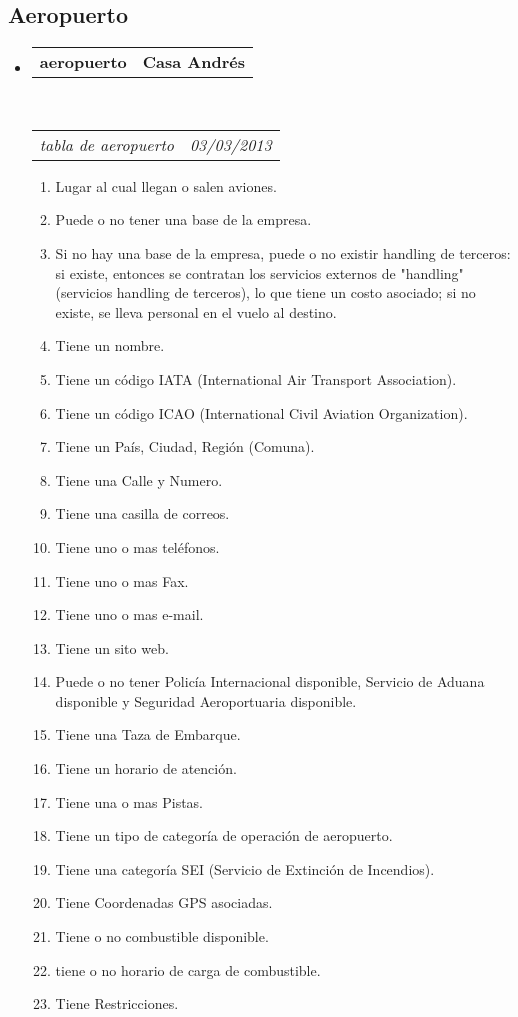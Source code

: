 \documentclass[10pt,letterpaper]{article}
\makeatletter
\newcommand{\headerrow}[2]
{\begin{tabular*}{\linewidth}{l@{\extracolsep{\fill}}r}
	#1 &
	#2 \\
\end{tabular*}}
\makeatother
\begin{document}
\subsection*{Aeropuerto}

\begin{itemize}
	\parskip=0.1em

	\item
	\headerrow
		{\textbf{aeropuerto}}
		{\textbf{Casa Andrés}}
	\\
	\headerrow
		{\emph{tabla de aeropuerto}}
		{\emph{03/03/2013}}
	\begin{enumerate}
		\item Lugar al cual llegan o salen aviones.
		\item Puede o no tener una base de la empresa.
		\item Si no hay una base de la empresa, puede o no existir handling de terceros: si existe, entonces se contratan los servicios externos de "handling" (servicios handling de terceros), lo que tiene un costo asociado; si no existe, se lleva personal en el vuelo al destino.
		\item Tiene un nombre.
		\item Tiene un código IATA (International Air Transport Association).
		\item Tiene un código ICAO (International Civil Aviation Organization).
		\item Tiene un País, Ciudad, Región (Comuna).
		\item Tiene una Calle y Numero.
		\item Tiene una casilla de correos.
		\item Tiene uno o mas teléfonos.
		\item Tiene uno o mas Fax.
		\item Tiene uno o mas e-mail.
		\item Tiene un sito web.
		\item Puede o no tener Policía Internacional disponible, Servicio de Aduana disponible y Seguridad Aeroportuaria disponible.
		\item Tiene una Taza de Embarque.
		\item Tiene un horario de atención.
		\item Tiene una o mas Pistas.
		\item Tiene un tipo de categoría de operación de aeropuerto.
		\item Tiene una categoría SEI (Servicio de Extinción de Incendios).
		\item Tiene Coordenadas GPS asociadas.
		\item Tiene o no combustible disponible.
		\item tiene o no horario de carga de combustible.
		\item Tiene Restricciones.
	\end{enumerate}

\end{itemize}
\end{document}
